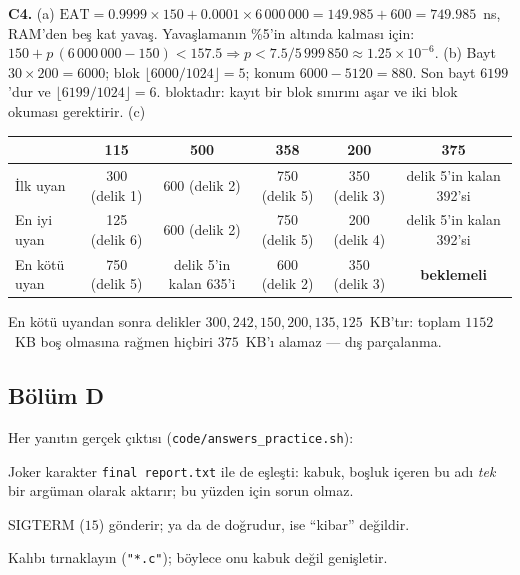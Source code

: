 \textbf{C4.} (a) $\text{EAT} = 0.9999 \times 150 + 0.0001 \times 6\,000\,000 = 149.985 + 600 = 749.985$~ns, RAM'den beş kat yavaş. Yavaşlamanın \%5'in altında kalması için: $150 + p\,(6\,000\,000 - 150) < 157.5 \Rightarrow p < 7.5/5\,999\,850 \approx 1.25 \times 10^{-6}$. (b) Bayt $30 \times 200 = 6000$; blok $\lfloor 6000/1024 \rfloor = 5$; konum $6000 - 5120 = 880$. Son bayt $6199$'dur ve $\lfloor 6199/1024 \rfloor = 6$. bloktadır: kayıt bir blok sınırını aşar ve iki blok okuması gerektirir. (c)
\begin{center}
\small
\renewcommand{\arraystretch}{1.15}
\begin{tabular}{@{}lccccc@{}}
\toprule
& \textbf{115} & \textbf{500} & \textbf{358} & \textbf{200} & \textbf{375} \\
\midrule
İlk uyan & 300 (delik 1) & 600 (delik 2) & 750 (delik 5) & 350 (delik 3) & delik 5'in kalan 392'si \\
En iyi uyan & 125 (delik 6) & 600 (delik 2) & 750 (delik 5) & 200 (delik 4) & delik 5'in kalan 392'si \\
En kötü uyan & 750 (delik 5) & delik 5'in kalan 635'i & 600 (delik 2) & 350 (delik 3) & \textbf{beklemeli} \\
\bottomrule
\end{tabular}
\end{center}
En kötü uyandan sonra delikler $300, 242, 150, 200, 135, 125$~KB'tır: toplam $1152$~KB boş olmasına rağmen hiçbiri $375$~KB'ı alamaz --- dış parçalanma.

\subsection*{Bölüm D}
Her yanıtın gerçek çıktısı (\texttt{code/answers\_practice.sh}):



Joker karakter \texttt{final report.txt} ile de eşleşti: kabuk, boşluk içeren bu adı \emph{tek} bir argüman olarak aktarır; bu yüzden  için sorun olmaz.



 SIGTERM ($15$) gönderir;  ya da  de doğrudur,  ise ``kibar'' değildir.

Kalıbı tırnaklayın (\texttt{"*.c"}); böylece onu kabuk değil  genişletir.

